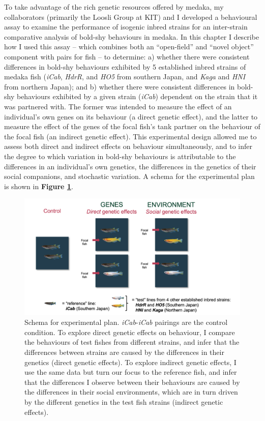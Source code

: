 \documentclass[
]{book}
\begin{document}
To take advantage of the rich genetic resources offered by medaka, my collaborators (primarily the Loosli Group at KIT) and I developed a behavioural assay to examine the performance of isogenic inbred strains for an inter-strain comparative analysis of bold-shy behaviours in medaka. In this chapter I describe how I used this assay -- which combines both an ``open-field'' and ``novel object'' component with pairs for fish -- to determine: a) whether there were consistent differences in bold-shy behaviours exhibited by 5 established inbred strains of medaka fish (\emph{iCab}, \emph{HdrR}, and \emph{HO5} from southern Japan, and \emph{Kaga} and \emph{HNI} from northern Japan); and b) whether there were consistent differences in bold-shy behaviours exhibited by a given strain (\emph{iCab}) dependent on the strain that it was partnered with. The former was intended to measure the effect of an individual's own genes on its behaviour (a direct genetic effect), and the latter to measure the effect of the genes of the focal fish's tank partner on the behaviour of the focal fish (an indirect genetic effect). This experimental design allowed me to assess both direct and indirect effects on behaviour simultaneously, and to infer the degree to which variation in bold-shy behaviours is attributable to the differences in an individual's own genetics, the differences in the genetics of their social companions, and stochastic variation. A schema for the experimental plan is shown in \textbf{Figure \ref{fig:behavioural-schema}}.



\begin{figure}
\includegraphics[width=1\linewidth]{figs/pilot/experimental_schema} \caption{Schema for experimental plan. \emph{iCab}-\emph{iCab} pairings are the control condition. To explore direct genetic effects on behaviour, I compare the behaviours of test fishes from different strains, and infer that the differences between strains are caused by the differences in their genetics (direct genetic effects). To explore indirect genetic effects, I use the same data but turn our focus to the reference fish, and infer that the differences I observe between their behaviours are caused by the differences in their social environments, which are in turn driven by the different genetics in the test fish strains (indirect genetic effects).}\label{fig:behavioural-schema}
\end{figure}
\end{document}
